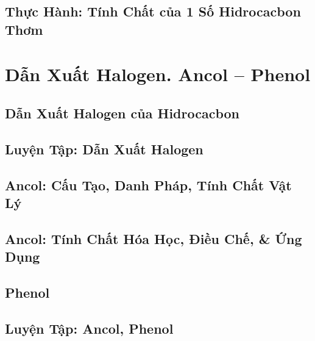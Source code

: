 \documentclass[oneside]{book}
\numberwithin{equation}{section}
\begin{document}

\section{Thực Hành: Tính Chất của 1 Số Hidrocacbon Thơm}


\chapter{Dẫn Xuất Halogen. Ancol -- Phenol}

\section{Dẫn Xuất Halogen của Hidrocacbon}


\section{Luyện Tập: Dẫn Xuất Halogen}


\section{Ancol: Cấu Tạo, Danh Pháp, Tính Chất Vật Lý}


\section{Ancol: Tính Chất Hóa Học, Điều Chế, \& Ứng Dụng}


\section{Phenol}


\section{Luyện Tập: Ancol, Phenol}
\end{document}
